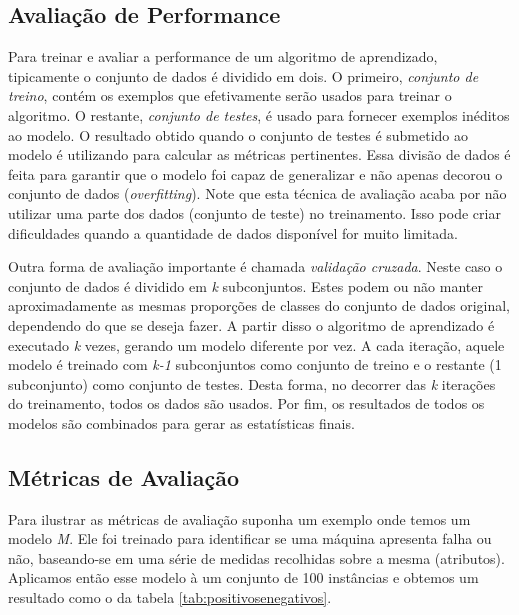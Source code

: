\subsection{Avaliação de Performance}

Para treinar e avaliar a performance de um algoritmo de aprendizado, tipicamente o conjunto de dados é dividido em dois.
O primeiro, \textit{conjunto de treino}, contém os exemplos que efetivamente serão usados para treinar o algoritmo.
O restante, \textit{conjunto de testes}, é usado para fornecer exemplos inéditos ao modelo.
O resultado obtido quando o conjunto de testes é submetido ao modelo é utilizando para calcular as métricas pertinentes.
Essa divisão de dados é feita para garantir que o modelo foi capaz de generalizar e não apenas decorou o conjunto de dados (\textit{overfitting}).
Note que esta técnica de avaliação acaba por não utilizar uma parte dos dados (conjunto de teste) no treinamento.
Isso pode criar dificuldades quando a quantidade de dados disponível for muito limitada.

Outra forma de avaliação importante é chamada \textit{validação cruzada}.
Neste caso o conjunto de dados é dividido em \textit{k} subconjuntos.
Estes podem ou não manter aproximadamente as mesmas proporções de classes do conjunto de dados original, dependendo do que se deseja fazer.
A partir disso o algoritmo de aprendizado é executado \textit{k} vezes, gerando um modelo diferente por vez.
A cada iteração, aquele modelo é treinado com \textit{k-1} subconjuntos como conjunto de treino e o restante (1 subconjunto) como conjunto de testes.
Desta forma, no decorrer das \textit{k} iterações do treinamento, todos os dados são usados.
Por fim, os resultados de todos os modelos são combinados para gerar as estatísticas finais.

\subsection{Métricas de Avaliação}

Para ilustrar as métricas de avaliação suponha um exemplo onde temos um modelo \textit{M}.
Ele foi treinado para identificar se uma máquina apresenta falha ou não, baseando-se em uma série de medidas recolhidas sobre a mesma (atributos).
Aplicamos então esse modelo à um conjunto de 100 instâncias e obtemos um resultado como o da tabela \ref{tab:positivosenegativos}.

